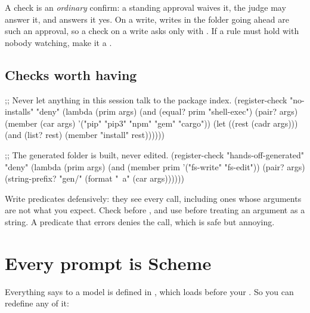 \begin{careful}
A  check is an \emph{ordinary} confirm: a standing approval
waives it, the judge may answer it, and  answers it yes. On a
write, writes in the folder going ahead are such an approval, so a
 check on a write asks only with . If a rule must hold with nobody watching, make it a .
\end{careful}

\subsection{Checks worth having}

\begin{scm}
;; Never let anything in this session talk to the package index.
(register-check "no-installs" "deny"
  (lambda (prim args)
    (and (equal? prim "shell-exec")
         (pair? args)
         (member (car args) '("pip" "pip3" "npm" "gem" "cargo"))
         (let ((rest (cadr args)))
           (and (list? rest) (member "install" rest))))))

;; The generated folder is built, never edited.
(register-check "hands-off-generated" "deny"
  (lambda (prim args)
    (and (member prim '("fs-write" "fs-edit"))
         (pair? args)
         (string-prefix? "gen/" (format "~a" (car args))))))
\end{scm}

\begin{tip}
Write predicates defensively: they see every call, including ones whose
arguments are not what you expect. Check  before
, and use  before
treating an argument as a string. A predicate that errors denies the call,
which is safe but annoying.
\end{tip}

\section{Every prompt is Scheme}

Everything \nodwyn{} says to a model is defined in
, which loads before your .
So you can redefine any of it:

